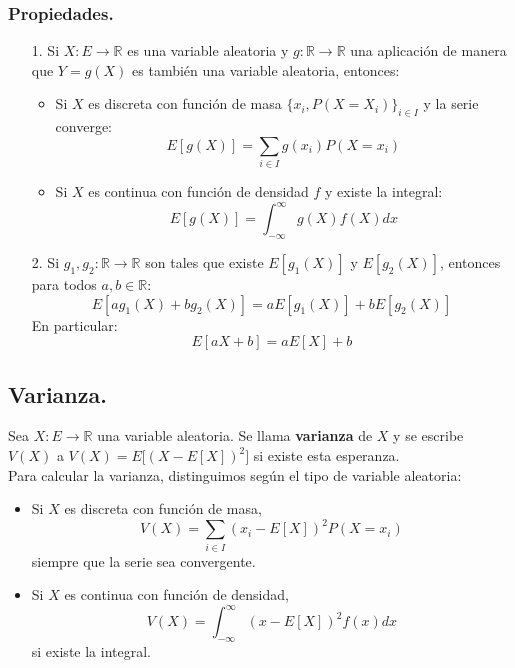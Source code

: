 \subsubsection{Propiedades.}
\begin{itemize}
\item[1.]Si $X:E\to\mathbb{R}$ es una variable aleatoria y $g: \mathbb{R}\to\mathbb{R}$ una aplicación de manera que $Y=g(X)$ es también una variable aleatoria, entonces:
\begin{itemize}
\item Si $X$ es discreta con función de masa $\{x_{i},P(X=X_{i})\}_{i\in I}$ y la serie converge:
\[E[g(X)]=\sum_{i\in I}g(x_{i})P(X=x_{i})\]
\item Si $X$ es continua con función de densidad $f$ y existe la integral:
\[E[g(X)]=\int_{-\infty}^{\infty}g(X)f(X)dx\]
\end{itemize}
\item[2.]Si $g_{1}, g_{2}:\mathbb{R} \to \mathbb{R}$ son tales que existe $E[g_{1}(X)]$ y $E[g_{2}(X)]$, entonces para todos $a,b \in \mathbb{R}$:
\[E[ag_{1}(X)+bg_{2}(X)]=aE[g_{1}(X)]+bE[g_{2}(X)]\]
En particular:
\[E[aX+b]=aE[X]+b\]
\end{itemize}

\subsection{Varianza.}
Sea $X:E\to\mathbb{R}$ una variable aleatoria. Se llama \textbf{varianza} de $X$ y se escribe $V(X)$ a $V(X)=E \big[ (X-E[X])^{2} \big]$ si existe esta esperanza.\\
Para calcular la varianza, distinguimos según el tipo de variable aleatoria:
\begin{itemize}
\item Si $X$ es discreta con función de masa,
\[V(X)=\sum_{i\in I}(x_{i}-E[X])^{2}P(X=x_{i})\]
siempre que la serie sea convergente.
\item Si $X$ es continua con función de densidad,
\[V(X)=\int_{-\infty}^{\infty}(x-E[X])^{2}f(x)dx\]
si existe la integral.
\end{itemize}
